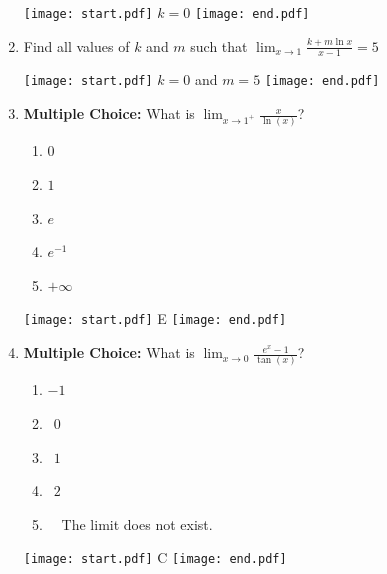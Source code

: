 \documentclass[12pt]{article}
\begin{document}
\begin{enumerate}
\texttt{[image: start.pdf]}
{{$k=0$}}
\texttt{[image: end.pdf]}


\item Find all values of $k$ and $m$ such that $\lim_{x \rightarrow 1}{\frac{k+m\ln{x}}{x-1}}=5$

\texttt{[image: start.pdf]}
{{$k=0$ and $m=5$}}
\texttt{[image: end.pdf]}


\item {\bf Multiple Choice:} What is $\displaystyle \lim_{x\rightarrow 1^+} \frac{x}{\ln(x)}$?

\begin{enumerate}

\item $0$\\

\item $1$\\

\item $e$\\

\item $e^{-1}$\\

\item $+\infty$

\end{enumerate}

\texttt{[image: start.pdf]}
{{E}}
\texttt{[image: end.pdf]}


\item {\bf Multiple Choice:} What is $\displaystyle \lim_{x\rightarrow 0}\frac{e^x-1}{\tan(x)}$?

\begin{enumerate}

\item $-1$\\

\item $\ \ 0$\\

\item $\ \ 1$\\

\item $\ \ 2$\\

\item \ \ The limit does not exist.

\end{enumerate}

\texttt{[image: start.pdf]}
{{C}}
\texttt{[image: end.pdf]}



\end{enumerate}
\end{document}
